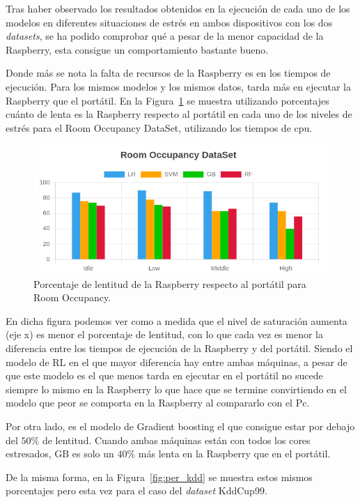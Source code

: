 \documentclass[a4paper, 12pt]{book}
\begin{document}
Tras haber observado los resultados obtenidos en la ejecución de cada uno de los modelos en diferentes situaciones de estrés en ambos dispositivos con los dos \textit{datasets}, se ha podido comprobar qué a pesar de la menor capacidad de la Raspberry, esta consigue un comportamiento bastante bueno.

Donde más se nota la falta de recursos de la Raspberry es en los tiempos de ejecución. Para los mismos modelos y los mismos datos, tarda más en ejecutar la Raspberry que el portátil. En la Figura~\ref{fig:per_occupancy} se muestra utilizando porcentajes cuánto de lenta es la Raspberry respecto al portátil en cada uno de los niveles de estrés para el Room Occupancy DataSet, utilizando los tiempos de cpu.

\begin{figure}[]
  \centering
  \includegraphics[width=14cm, keepaspectratio]{img/per_occupancy.png}
  \caption{Porcentaje de lentitud de la Raspberry respecto al portátil para Room Occupancy.}
  \label{fig:per_occupancy}
\end{figure}

En dicha figura podemos ver como a medida que el nivel de saturación aumenta (eje x) es menor el porcentaje de lentitud, con lo que cada vez es menor la diferencia entre los tiempos de ejecución de la Raspberry y del portátil. Siendo el modelo de RL en el que mayor diferencia hay entre ambas máquinas, a pesar de que este modelo es el que menos tarda en ejecutar en el portátil no sucede siempre lo mismo en la Raspberry lo que hace que se termine convirtiendo en el modelo que peor se comporta en la Raspberry al compararlo con el Pc.

Por otra lado, es el modelo de Gradient boosting el que consigue estar por debajo del $50\%$ de lentitud. Cuando ambas máquinas están con todos los cores estresados, GB es solo un $40\%$ más lenta en la Raspberry que en el portátil.

De la misma forma, en la Figura~\ref{fig:per_kdd} se muestra estos mismos porcentajes pero esta vez para el caso del \textit{dataset} KddCup99.
\end{document}
